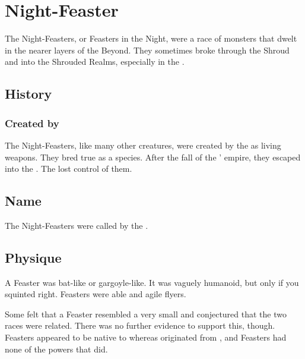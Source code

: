 \section{Night-Feaster}
The Night-Feasters, or Feasters in the Night, were a race of monsters that dwelt in the nearer layers of the Beyond. 
They sometimes broke through the Shroud and into the Shrouded Realms, especially in the \wylde. 









\subsection{History}





\subsubsection{Created by \ophidians}
The Night-Feasters, like many other creatures, were created by the \ophidians as living weapons. 
They bred true as a species. 
After the fall of the \ophidians' empire, they escaped into the \wylde.
The \ophidians lost control of them. 









\subsection{Name}
The Night-Feasters were called \emph{\feldraxes} by the \ophidians.









\subsection{Physique}
A Feaster was bat-like or gargoyle-like. 
It was vaguely humanoid, but only if you squinted right. 
Feasters were able and agile flyers. 

Some felt that a Feaster resembled a very small \umbra and conjectured that the two races were related. 
There was no further evidence to support this, though.
Feasters appeared to be native to \Miith whereas \umbrae originated from \Erebos, and Feasters had none of the powers that \umbrae did. 









